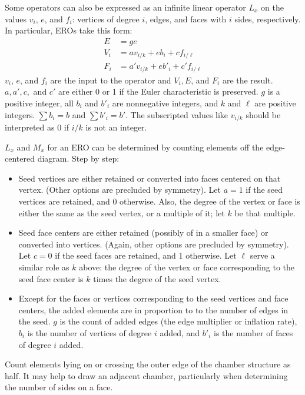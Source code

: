 \documentclass[12pt]{amsart}%
\begin{document}
Some operators can also be expressed as an infinite linear operator $L_x$ on
the values $v_i$, $e$, and $f_i$: vertices of degree $i$, edges, and faces with $i$ sides, respectively. In particular, EROs take this form:
\begin{equation}
  \begin{split}
  E & = ge \\
  V_i & = a v_{i/k} + e b_i + c f_{i/\ell} \\
  F_i & = a' v_{i/k} + e b'_i + c' f_{i/\ell}
  \end{split}
\end{equation}
$v_i$, $e$, and $f_i$ are the input to the operator and $V_i, E$, and $F_i$ are
the result. $a, a', c,$ and $c'$ are either 0 or 1 if the Euler characteristic
is preserved. $g$ is a positive integer, all $b_i$ and $b'_i$ are nonnegative
integers, and $k$ and $\ell$ are positive integers.
$\sum b_i = b$ and $\sum b'_i = b'$. The subscripted
values like $v_{i/k}$ should be interpreted as 0 if $i/k$ is not an integer.

$L_x$ and $M_x$ for an ERO can be determined by counting elements off the
edge-centered diagram. Step by step:
\begin{itemize}
\item Seed vertices are either retained or converted into faces centered on that
  vertex. (Other options are precluded by symmetry). Let $a = 1$ if the
  seed vertices are retained, and 0 otherwise. Also, the degree of the vertex
  or face is either the same as the seed vertex, or a multiple of it;
  let $k$ be that multiple.
\item Seed face centers are either retained (possibly of in a smaller face) or
  converted into vertices. (Again, other options are precluded by symmetry).
  Let $c = 0$ if the seed faces are retained, and 1 otherwise. Let
  $\ell$ serve a similar role as $k$ above: the degree of the vertex
  or face corresponding to the seed face center is $k$ times the degree of
  the seed vertex.
\item Except for the faces or vertices corresponding to the seed vertices and face
  centers, the added elements are in proportion to to the number of edges in the
  seed. $g$ is the count of added edges (the edge multiplier or inflation
  rate), $b_i$ is the number of vertices of degree $i$ added, and
  $b'_i$ is the number of faces of degree $i$ added.
\end{itemize}
Count elements lying on or crossing the outer edge of the chamber structure as
half. It may help to draw an adjacent chamber, particularly when determining
the number of sides on a face.
\end{document}

